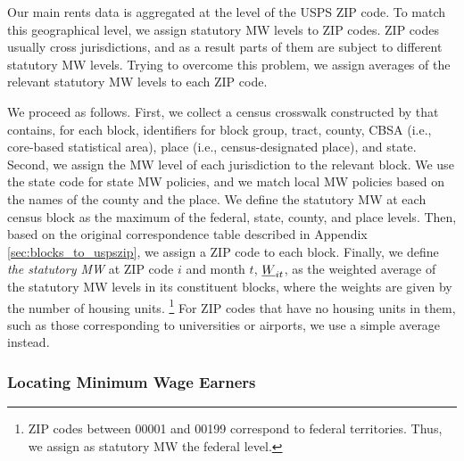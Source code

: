 Our main rents data is aggregated at the level of the USPS ZIP code.
To match this geographical level, we assign statutory MW levels to ZIP codes.
ZIP codes usually cross jurisdictions, and as a result parts of them
are subject to different statutory MW levels.
Trying to overcome this problem, we assign averages of the relevant statutory MW 
levels to each ZIP code.

We proceed as follows.
First, we collect a census crosswalk constructed by \parencite{CensusLODES} that 
contains, for each block, identifiers for block group, tract, county, CBSA 
(i.e., core-based statistical area), place (i.e., census-designated place), and 
state.
Second, we assign the MW level of each jurisdiction to the relevant block.
We use the state code for state MW policies, and we match local MW policies 
based on the names of the county and the place.
We define the statutory MW at each census block as the maximum of the federal,
state, county, and place levels.
Then, based on the original correspondence table described in Appendix 
\ref{sec:blocks_to_uspszip}, we assign a ZIP code to each block.
Finally, we define \textit{the statutory MW} at ZIP code $i$ and month $t$, 
$\underline{W}_{it}$, as the weighted average of the statutory MW levels in its
constituent blocks, where the weights are given by the number of housing 
units.%
\footnote{ZIP codes between 00001 and 00199 correspond to federal territories.
Thus, we assign as statutory MW the federal level.}
For ZIP codes that have no housing units in them, such as those corresponding to 
universities or airports, we use a simple average instead.

\subsubsection*{Locating Minimum Wage Earners}

